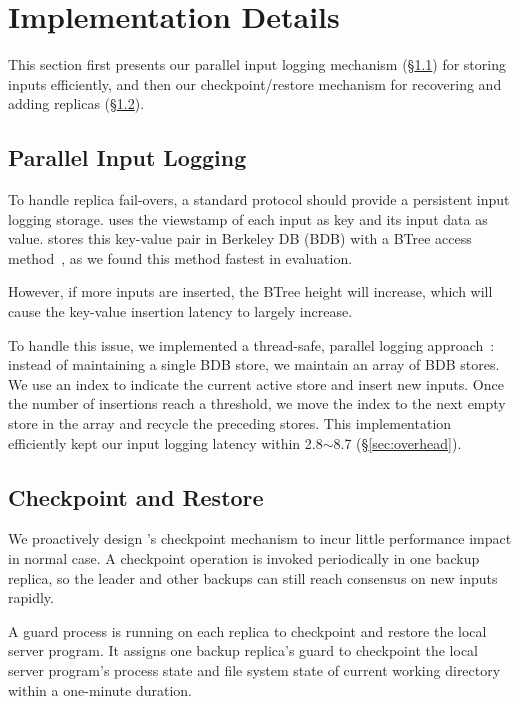 \section{Implementation Details} \label{sec:impl}

This section first presents our parallel input logging mechanism 
(\S\ref{sec:logging}) for storing inputs efficiently, and then our 
checkpoint/restore mechanism for recovering and adding replicas 
(\S\ref{sec:checkpoint}).

\subsection{Parallel Input Logging} \label{sec:logging}

To handle replica fail-overs, a standard \paxos protocol should provide a 
persistent input logging storage. \xxx uses the \paxos viewstamp of each input 
as key and its input data as value. \xxx stores this key-value pair in 
Berkeley DB (BDB) with a BTree access method~\cite{berkeleydb}, as we 
found this method fastest in evaluation.

However, if more inputs are inserted, the BTree height 
will increase, which will cause the key-value insertion latency to 
largely increase.

To handle this issue, we implemented a thread-safe, 
parallel logging approach~\cite{Bessani:usenix13}: instead of maintaining a 
single BDB store, we maintain an array of BDB stores. We use an index to 
indicate the current active store and insert new inputs. Once the number of 
insertions reach a threshold, we move the index to the next empty store in the 
array and recycle the preceding stores. This implementation efficiently kept 
our input logging latency within 2.8$\sim$8.7 \us (\S\ref{sec:overhead}).

\subsection{Checkpoint and Restore} \label{sec:checkpoint}

We proactively design \xxx's checkpoint mechanism to incur little performance 
impact in normal case. A checkpoint operation is invoked periodically 
in one backup replica, so the leader and other backups can still reach 
consensus on new inputs rapidly.

A guard process is running on each replica to checkpoint and restore the 
local server program. It assigns one backup 
replica's guard to checkpoint the local server program's process state and file 
system state of current working directory within a one-minute duration.


